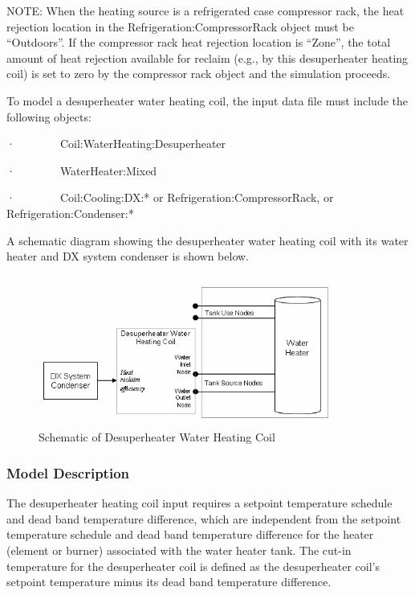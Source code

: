 NOTE: When the heating source is a refrigerated case compressor rack, the heat rejection location in the Refrigeration:CompressorRack object must be ``Outdoors''. If the compressor rack heat rejection location is ``Zone'', the total amount of heat rejection available for reclaim (e.g., by this desuperheater heating coil) is set to zero by the compressor rack object and the simulation proceeds.

To model a desuperheater water heating coil, the input data file must include the following objects:

·~~~~~~~~Coil:WaterHeating:Desuperheater

·~~~~~~~~WaterHeater:Mixed

·~~~~~~~~Coil:Cooling:DX:* or Refrigeration:CompressorRack, or Refrigeration:Condenser:*

A schematic diagram showing the desuperheater water heating coil with its water heater and DX system condenser is shown below.

\begin{figure}[hbtp] %
\centering
\includegraphics[width=0.9\textwidth, height=0.9\textheight, keepaspectratio=true]{media/image4049.png}
\caption{Schematic of Desuperheater Water Heating Coil \protect \label{fig:schematic-of-desuperheater-water-heating-coil}}
\end{figure}

\subsubsection{Model Description}\label{model-description-7}

The desuperheater heating coil input requires a setpoint temperature schedule and dead band temperature difference, which are independent from the setpoint temperature schedule and dead band temperature difference for the heater (element or burner) associated with the water heater tank. The cut-in temperature for the desuperheater coil is defined as the desuperheater coil's setpoint temperature minus its dead band temperature difference.

